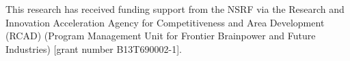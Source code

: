 This research has received funding support from the NSRF via the Research and Innovation Acceleration Agency for Competitiveness and Area Development (RCAD) (Program Management Unit for Frontier Brainpower and Future Industries) [grant number B13T690002-1].
